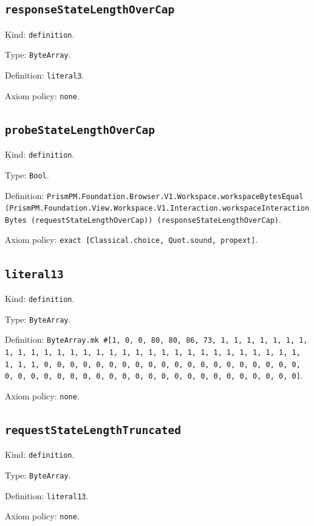 \documentclass[11pt]{article}
\begin{document}
\subsection*{\texttt{responseStateLengthOverCap}}
\noindent Kind: \texttt{definition}.\par
\noindent Type: \texttt{ByteArray}.\par
\noindent Definition: \texttt{literal3}.\par
\noindent Axiom policy: \texttt{none}.\par
\subsection*{\texttt{probeStateLengthOverCap}}
\noindent Kind: \texttt{definition}.\par
\noindent Type: \texttt{Bool}.\par
\noindent Definition: \texttt{PrismPM.Foundation.Browser.V1.Workspace.workspaceBytesEqual (PrismPM.Foundation.View.Workspace.V1.Interaction.workspaceInteractionBytes (requestStateLengthOverCap)) (responseStateLengthOverCap)}.\par
\noindent Axiom policy: \texttt{exact [Classical.choice, Quot.sound, propext]}.\par
\subsection*{\texttt{literal13}}
\noindent Kind: \texttt{definition}.\par
\noindent Type: \texttt{ByteArray}.\par
\noindent Definition: \texttt{ByteArray.mk \#[1, 0, 0, 80, 80, 86, 73, 1, 1, 1, 1, 1, 1, 1, 1, 1, 1, 1, 1, 1, 1, 1, 1, 1, 1, 1, 1, 1, 1, 1, 1, 1, 1, 1, 1, 1, 1, 1, 1, 1, 0, 0, 0, 0, 0, 0, 0, 0, 0, 0, 0, 0, 0, 0, 0, 0, 0, 0, 0, 0, 0, 0, 0, 0, 0, 0, 0, 0, 0, 0, 0, 0, 0, 0, 0, 0, 0, 0, 0, 0, 0, 0, 0]}.\par
\noindent Axiom policy: \texttt{none}.\par
\subsection*{\texttt{requestStateLengthTruncated}}
\noindent Kind: \texttt{definition}.\par
\noindent Type: \texttt{ByteArray}.\par
\noindent Definition: \texttt{literal13}.\par
\noindent Axiom policy: \texttt{none}.\par
\end{document}
